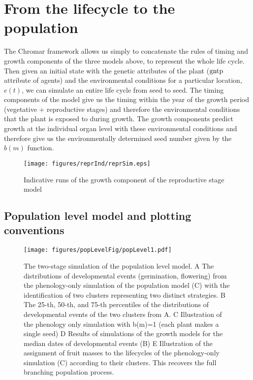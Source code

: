 \section{From the lifecycle to the population}
\label{sec:pop}
The Chromar framework allows us simply to concatenate the rules of
timing and growth components of the three models above, to represent the
whole life cycle. Then given an initial state with the genetic
attributes of the plant (\(\mathrm{gntp}\) attribute of agents) and the
environmental conditions for a particular location, \(e(t)\), we can
simulate an entire life cycle from seed to seed. The timing components
of the model give us the timing within the year of the growth period
(vegetative + reproductive stages) and therefore the environmental
conditions that the plant is exposed to during growth. The growth
components predict growth at the individual organ level with these
environmental conditions and therefore give us the environmentally
determined seed number given by the \(b(m)\) function.

\begin{figure}
  \centering
  \texttt{[image: figures/reprInd/reprSim.eps]}
  \caption{Indicative runs of the growth component of the reproductive stage model}
  \label{fig:reprGInd}
\end{figure}

\subsection{Population level model and plotting conventions}
\label{population-level-model-and-plotting-conventions}

\begin{figure}[tb]
\centering
\texttt{[image: figures/popLevelFig/popLevel1.pdf]}
\caption{The two-stage simulation of the population level model. A The
  distributions of developmental events (germination, flowering) from the
  phenology-only simulation of the population model (C) with the identification
  of two clusters representing two distinct strategies. B The 25-th, 50-th, and
  75-th percentiles of the distributions of developmental events of the two
  clusters from A. C Illustration of the phenology only simulation with b(m)=1
  (each plant makes a single seed) D Results of simulations of the growth models
  for the median dates of developmental events (B) E Illustration of the
  assignment of fruit masses to the lifecycles of the phenology-only simulation
  (C) according to their clusters. This recovers the full branching population
  process.}
\label{fig:popModel}
\end{figure}

